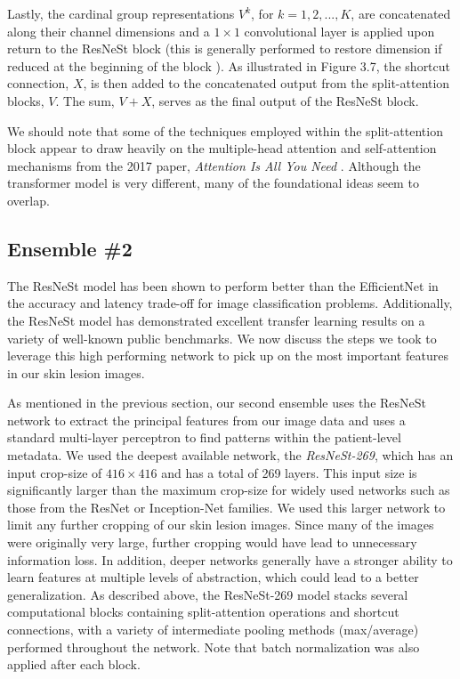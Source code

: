 \documentclass [MAS] {uclathes}
\begin{document}
Lastly, the cardinal group representations $V^k$, for $k=1, 2, ..., K$, are concatenated along their channel dimensions and a $1 \times 1$ convolutional layer is applied upon return to the ResNeSt block (this is generally performed to restore dimension if reduced at the beginning of the block \cite{resnet}). As illustrated in Figure 3.7, the shortcut connection, $X$, is then added to the concatenated output from the split-attention blocks, $V$. The sum, $V+X$, serves as the final output of the ResNeSt block.

We should note that some of the techniques employed within the split-attention block appear to draw heavily on the multiple-head attention and self-attention mechanisms from the 2017 paper, \textit{Attention Is All You Need} \cite{attention}. Although the transformer model is very different, many of the foundational ideas seem to overlap.

\subsection{Ensemble \#2}

The ResNeSt model has been shown to perform better than the EfficientNet in the accuracy and latency trade-off for image classification problems. Additionally, the ResNeSt model has demonstrated excellent transfer learning results on a variety of well-known public benchmarks. We now discuss the steps we took to leverage this high performing network to pick up on the most important features in our skin lesion images.

As mentioned in the previous section, our second ensemble uses the ResNeSt network to extract the principal features from our image data and uses a standard multi-layer perceptron to find patterns within the patient-level metadata. We used the deepest available network, the \textit{ResNeSt-269}, which has an input crop-size of $416 \times 416$ and has a total of 269 layers. This input size is significantly larger than the maximum crop-size for widely used networks such as those from the ResNet or Inception-Net families. We used this larger network to limit any further cropping of our skin lesion images. Since many of the images were originally very large, further cropping would have lead to unnecessary information loss. In addition, deeper networks generally have a stronger ability to learn features at multiple levels of abstraction, which could lead to a better generalization. As described above, the ResNeSt-269 model stacks several computational blocks containing split-attention operations and shortcut connections, with a variety of intermediate pooling methods (max/average) performed throughout the network. Note that batch normalization was also applied after each block.
\end{document}
